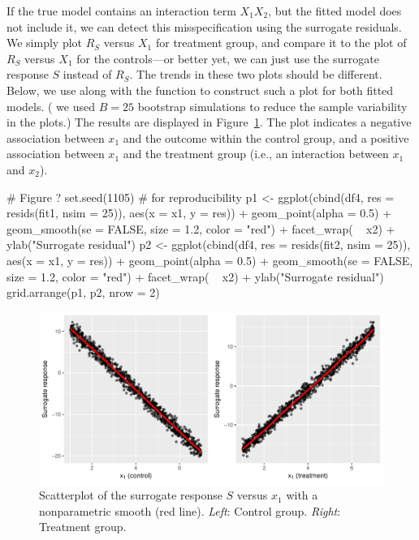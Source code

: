 If the true model contains an interaction term $X_1 X_2$, but the fitted model does not include it, we can detect this misspecification using the surrogate residuals. We simply plot $R_S$ versus $X_1$ for treatment group, and compare it to the plot of $R_S$ versus $X_1$ for the controls---or better yet, we can just use the surrogate response $S$ instead of $R_S$. The trends in these two plots should be different. Below, we use  along with the  function to construct such a plot for both fitted models. ( we used $B = 25$ bootstrap simulations to reduce the sample variability in the plots.) The results are displayed in Figure~\ref{fig:interaction}. The plot indicates a negative association between $x_1$ and the outcome within the control group, and a positive association between $x_1$ and the treatment group (i.e., an interaction between $x_1$ and $x_2$).
\begin{example}
# Figure ?
set.seed(1105)  # for reproducibility
p1 <- ggplot(cbind(df4, res = resids(fit1, nsim = 25)), aes(x = x1, y = res)) +
  geom_point(alpha = 0.5) +
  geom_smooth(se = FALSE, size = 1.2, color = "red") +
  facet_wrap( ~ x2) +
  ylab("Surrogate residual")
p2 <- ggplot(cbind(df4, res = resids(fit2, nsim = 25)), aes(x = x1, y = res)) +
  geom_point(alpha = 0.5) +
  geom_smooth(se = FALSE, size = 1.2, color = "red") +
  facet_wrap( ~ x2) +
  ylab("Surrogate residual")
grid.arrange(p1, p2, nrow = 2)
\end{example}

\begin{figure}[!htbp]
  \centering
  \includegraphics[width=1\textwidth]{interaction}
  \caption{Scatterplot of the surrogate response $S$ versus $x_1$ with a nonparametric smooth (red line). \textit{Left}: Control group. \textit{Right}: Treatment group.}
  \label{fig:interaction}
\end{figure}


